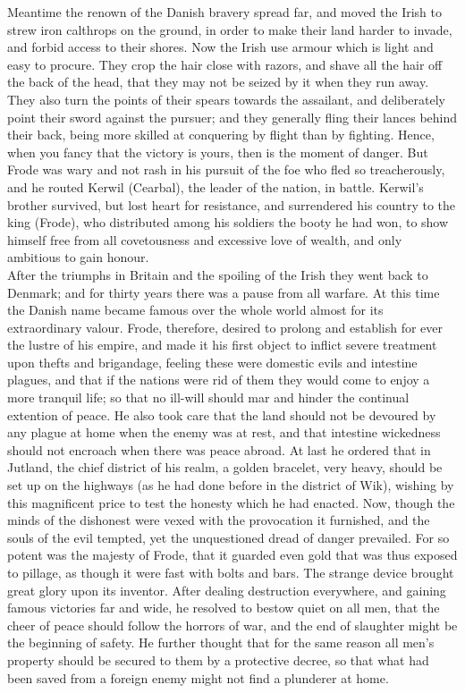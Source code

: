 \documentclass[10pt,a4paper]{report}
\begin{document}
Meantime the renown of the Danish bravery spread far, and moved the Irish to strew iron calthrops on the ground, in order to make their land harder to invade, and forbid access to their shores. Now the Irish use armour which is light and easy to procure. They crop the hair close with razors, and shave all the hair off the back of the head, that they may not be seized by it when they run away. They also turn the points of their spears towards the assailant, and deliberately point their sword against the pursuer; and they generally fling their lances behind their back, being more skilled at conquering by flight than by fighting. Hence, when you fancy that the victory is yours, then is the moment of danger. But Frode was wary and not rash in his pursuit of the foe who fled so treacherously, and he routed Kerwil (Cearbal), the leader of the nation, in battle. Kerwil's brother survived, but lost heart for resistance, and surrendered his country to the king (Frode), who distributed among his soldiers the booty he had won, to show himself free from all covetousness and excessive love of wealth, and only ambitious to gain honour.\\

After the triumphs in Britain and the spoiling of the Irish they went back to Denmark; and for thirty years there was a pause from all warfare. At this time the Danish name became famous over the whole world almost for its extraordinary valour. Frode, therefore, desired to prolong and establish for ever the lustre of his empire, and made it his first object to inflict severe treatment upon thefts and brigandage, feeling these were domestic evils and intestine plagues, and that if the nations were rid of them they would come to enjoy a more tranquil life; so that no ill-will should mar and hinder the continual extention of peace. He also took care that the land should not be devoured by any plague at home when the enemy was at rest, and that intestine wickedness should not encroach when there was peace abroad. At last he ordered that in Jutland, the chief district of his realm, a golden bracelet, very heavy, should be set up on the highways (as he had done before in the district of Wik), wishing by this magnificent price to test the honesty which he had enacted. Now, though the minds of the dishonest were vexed with the provocation it furnished, and the souls of the evil tempted, yet the unquestioned dread of danger prevailed. For so potent was the majesty of Frode, that it guarded even gold that was thus exposed to pillage, as though it were fast with bolts and bars. The strange device brought great glory upon its inventor. After dealing destruction everywhere, and gaining famous victories far and wide, he resolved to bestow quiet on all men, that the cheer of peace should follow the horrors of war, and the end of slaughter might be the beginning of safety. He further thought that for the same reason all men's property should be secured to them by a protective decree, so that what had been saved from a foreign enemy might not find a plunderer at home.\\
\end{document}
